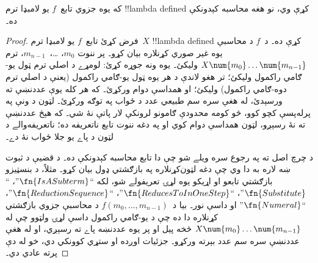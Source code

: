\documentclass[../../../include/open-logic-section]{subfiles}
\begin{document}

\begin{thm}
که يوه جزوي تابع~$f$ يو لامبډا ترم !!{lambda defined} کړې وي، نو
هغه محاسبه کېدونکې ده۔
\end{thm}

\begin{proof}
فرض کړئ تابع~$f$ يو لامبډا ترم~$X$ !!{lambda defined} کړې ده۔ د~$f$
د محاسبې يوه غير صوري کړنلاره بيان کړو۔ پر ننوت $m_0$،
\dots،~$m_{n-1}$، ترم $X \num{m_0} \ldots \num{m_{n-1}}$ وليکئ۔ يوه ونه جوړه کړئ: لومړے د اصلي ترم ټول يو-ګامي
راکمول وليکئ؛ تر هغو لاندې د هر يوه ټول يو-ګامي راکمول (يعنې د اصلي
ترم دوه-ګامي راکمول) وليکئ؛ او همداسې دوام ورکړئ۔ که هر کله يوې
عددنښې ته ورسېدئ، له هغې سره سم طبيعي عدد د ځواب په توګه ورکړئ۔
لټون د ونې په پرله‌پسې کچو کوو، څو کومه محدودې ګامونو لرونکې
لار پاتې نۀ شي۔ که هېڅ عددنښې ته نۀ رسېږو، لټون همداسې دوام کوي
او په دغه ننوت تابع ناتعريفه ده؛ ناتعريفه‌والے د لټون د پاے
يو جلا ځواب نۀ دے۔

د چرچ اصل ته په رجوع سره ويلے شو چې دا تابع محاسبه کېدونکې ده۔ د
قضيې د ثبوت ښه لاره به دا وي چې دغه لټون‌کړنلاره په بازګشتي ډول
بيان کړو۔ مثلاً، د بنسټيزو بازګشتي تابعو او اړيکو يوه لړۍ تعريفولے
شو، لکه ``$\fn{IsASubterm}$''، ``$\fn{Substitute}$''،
``$\fn{ReducesToInOneStep}$''، ``$\fn{ReductionSequence}$''،
``$\fn{Numeral}$'' او داسې نور۔ بيا د~$f(m_0, \dots, m_{n-1})$
د محاسبې جزوي بازګشتي کړنلاره دا ده چې د يو-ګامي راکمول داسې لړۍ
ولټوو چې له $X \num{m_0} \dots \num{m_{n-1}}$ څخه پيل او پر يوه
عددنښه پاے ته رسېږي، او له هغې عددنښې سره سم عدد بېرته ورکړو۔
جزئيات اوږده او ستړي کوونکي دي، خو له دې پرته عادي دي۔
\end{proof}
\end{document}
